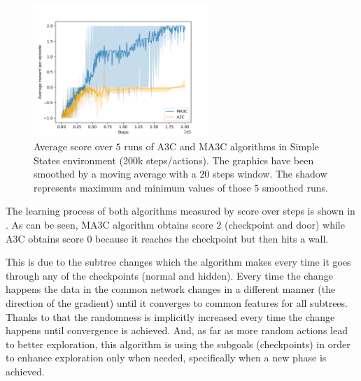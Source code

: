\begin{figure}[hbtp]
\begin{center}
\includegraphics[width=250]{img/SimpleStates_performance.png}
\end{center}
\caption[Simple States performance]
{Average score over $5$ runs of \ac{A3C} and \ac{MA3C} algorithms in Simple States environment (200k steps/actions).
The graphics have been smoothed by a moving average with a $20$ steps window.
The shadow represents maximum and minimum values of those $5$ smoothed runs.}
\label{fig:SimpleStates_performance}
\end{figure}

The learning process of both algorithms measured by score over steps is shown in .
As can be seen, \ac{MA3C} algorithm obtains score $2$ (checkpoint and door) while \ac{A3C} obtains score $0$ because it
reaches the checkpoint but then hits a wall.

This is due to the subtree changes which the algorithm makes every time it goes through any of the checkpoints (normal
and hidden).
Every time the change happens the data in the common network changes in a different manner (the direction of the gradient) %
until it converges to common features for all subtrees.
Thanks to that the randomness is implicitly increased every time the change happens until convergence is achieved.
And, as far as more random actions lead to better exploration, this algorithm is using the subgoals (checkpoints) in
order to enhance exploration only when needed, specifically when a new phase is achieved.

